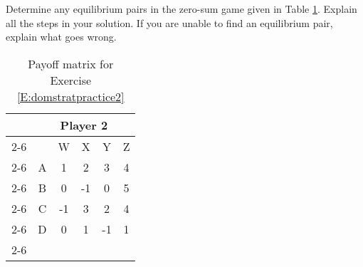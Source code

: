 \begin{xca}\label{E:domstratpractice2} Determine any equilibrium pairs in the zero-sum game given in Table \ref{T:domstratpractice2}.  Explain all the steps in your solution. If you are unable to find an equilibrium pair, explain what goes wrong.




\begin{table}[h]
\centering
\begin{tabular}{lccccc}
                      & \multicolumn{5}{c}{Player 2}                                                                                                  \\ \cline{2-6} 
\multicolumn{1}{l|}{} & \multicolumn{1}{c|}{} & \multicolumn{1}{c|}{W} & \multicolumn{1}{c|}{X} & \multicolumn{1}{c|}{Y} & \multicolumn{1}{c|}{Z} \\ \cline{2-6} 
\multicolumn{1}{l|}{Player 1} & \multicolumn{1}{c|}{A} & \multicolumn{1}{c|}{1} & \multicolumn{1}{c|}{2} & \multicolumn{1}{c|}{3} & \multicolumn{1}{c|}{4} \\ \cline{2-6} 
\multicolumn{1}{l|}{} & \multicolumn{1}{c|}{B} & \multicolumn{1}{c|}{0} & \multicolumn{1}{c|}{-1} & \multicolumn{1}{c|}{0} & \multicolumn{1}{c|}{5} \\ \cline{2-6} 
\multicolumn{1}{l|}{} & \multicolumn{1}{c|}{C} & \multicolumn{1}{c|}{-1} & \multicolumn{1}{c|}{3} & \multicolumn{1}{c|}{2} & \multicolumn{1}{c|}{4} \\ \cline{2-6} 
\multicolumn{1}{l|}{} & \multicolumn{1}{c|}{D} & \multicolumn{1}{c|}{0} & \multicolumn{1}{c|}{1} & \multicolumn{1}{c|}{-1} & \multicolumn{1}{c|}{1} \\ \cline{2-6} 
\end{tabular}
\caption{Payoff matrix for Exercise \ref{E:domstratpractice2}}
\label{T:domstratpractice2}

\end{table}
\end{xca}


